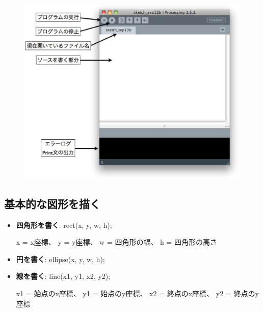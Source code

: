\documentclass[11pt,a4paper]{jarticle}
\begin{document}
\begin{figure}[h!]
 \centering
 \includegraphics[width=0.5\columnwidth]{processing_ide.eps}
\end{figure}


\subsection*{基本的な図形を描く}

\begin{itemize}
 \item \textbf{四角形を書く}: rect(x, y, w, h);

       x = x座標、
       y = y座標、
       w = 四角形の幅、
       h = 四角形の高さ

 \item \textbf{円を書く}: ellipse(x, y, w, h);
 \item \textbf{線を書く}: line(x1, y1, x2, y2);
       
       x1 = 始点のx座標、
       y1 = 始点のy座標、
       x2 = 終点のx座標、
       y2 = 終点のy座標

\end{itemize}
\end{document}
